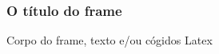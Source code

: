 \begin{frame}[<alinhamento>]
  \frametitle{O título do frame}
  Corpo do frame, texto e/ou cógidos Latex
\end{frame}

